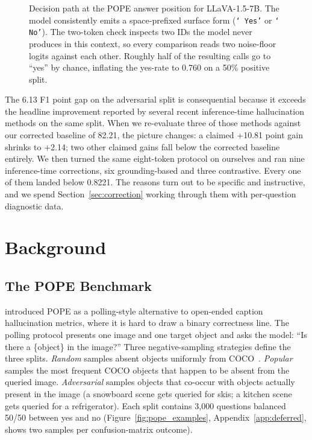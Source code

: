 \documentclass{article}
\begin{document}
\begin{figure}[t]
{}
\caption{Decision path at the POPE answer position for LLaVA-1.5-7B.
The model consistently emits a space-prefixed surface form
(\texttt{`\,Yes'} or \texttt{`\,No'}). The two-token check inspects two
IDs the model never produces in this context, so every comparison reads
two noise-floor logits against each other. Roughly half of the resulting
calls go to ``yes'' by chance, inflating the yes-rate to 0.760 on a 50\%
positive split.}
\label{fig:pipeline}
\end{figure}

The 6.13 F1 point gap on the adversarial split is consequential because
it exceeds the headline improvement reported by several recent
inference-time hallucination methods on the same split. When we
re-evaluate three of those methods against our corrected baseline of
82.21, the picture changes: a claimed +10.81 point gain shrinks to
+2.14; two other claimed gains fall below the corrected baseline
entirely. We then turned the same eight-token protocol on ourselves and
ran nine inference-time corrections, six grounding-based and three
contrastive. Every one of them landed below 0.8221. The reasons turn
out to be specific and instructive, and we spend Section~\ref{sec:correction}
working through them with per-question diagnostic data.

\section{Background}
\label{sec:background}

\subsection{The POPE Benchmark}

\citet{li2023evaluating} introduced POPE as a polling-style alternative
to open-ended caption hallucination metrics, where it is hard to draw a
binary correctness line. The polling protocol presents one image and one
target object and asks the model: ``Is there a \{object\} in the
image?'' Three negative-sampling strategies define the three splits.
\emph{Random} samples absent objects uniformly from
COCO~\citep{lin2014microsoft}. \emph{Popular} samples the most frequent
COCO objects that happen to be absent from the queried image.
\emph{Adversarial} samples objects that co-occur with objects actually
present in the image (a snowboard scene gets queried for skis; a kitchen
scene gets queried for a refrigerator). Each split contains 3{,}000
questions balanced 50/50 between yes and no
(Figure~\ref{fig:pope_examples}, Appendix~\ref{app:deferred}, shows two
samples per confusion-matrix outcome).
\end{document}

